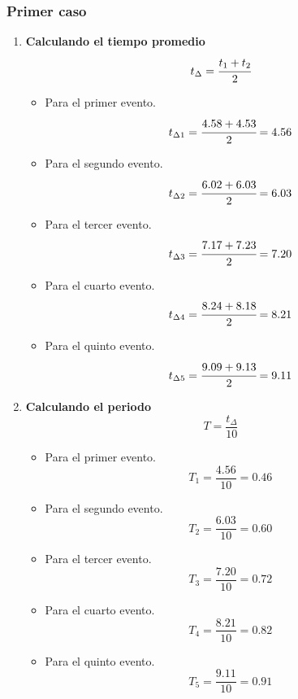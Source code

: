 \subsubsection{Primer caso}
\begin{enumerate}[label=\bfseries\alph*.-,itemsep=2pt]
	\item \textbf{Calculando el tiempo promedio}
	      \[t_\Delta = \cfrac{t_1+t_2}{2}\]


	      \begin{itemize}[label=\textbf{$\bullet$},itemsep=2pt,partopsep=6pt]
		      \item Para el primer evento.
		            \[t_{\Delta{1}}=\cfrac{4.58+4.53}{2}=4.56\]
		      \item Para el segundo evento.
		            \[t_{\Delta{2}}=\cfrac{6.02+6.03}{2}=6.03\]
		      \item Para el tercer evento.
		            \[t_{\Delta{3}}=\cfrac{7.17+7.23}{2}=7.20\]
		      \item Para el cuarto evento.
		            \[t_{\Delta{4}}=\cfrac{8.24+8.18}{2}=8.21\]
		      \item Para el quinto evento.
		            \[t_{\Delta{5}}=\cfrac{9.09+9.13}{2}=9.11\]
	      \end{itemize}
	\item \textbf{Calculando el periodo}
	      \[T = \dfrac{t_\Delta}{10}\]
	      \begin{itemize}[label=\textbf{$\bullet$},itemsep=2pt,partopsep=6pt]
		      \item Para el primer evento.
		            \[T_1 = \dfrac{4.56}{10}=0.46\]
		      \item Para el segundo evento.
		            \[T_2 = \dfrac{6.03}{10}=0.60\]
		      \item Para el tercer evento.
		            \[T_3 = \dfrac{7.20}{10}=0.72\]
		      \item Para el cuarto evento.
		            \[T_4 = \dfrac{8.21}{10}=0.82\]
		      \item Para el quinto evento.
		            \[T_5 = \dfrac{9.11}{10}=0.91\]
	      \end{itemize}


\end{enumerate}
